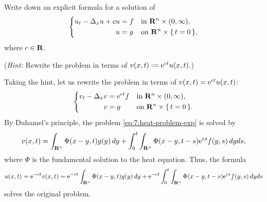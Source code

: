 \begin{problem}
  Write down an explicit formula for a solution of
  \[
    \left\{
      \begin{aligned}
        u_t-\Delta_x u+cu&=f&&\text{in \(\mathbf{R}^n\times(0,\infty)\),}\\
        u&=g&&\text{on \(\mathbf{R}^n\times\{\,t=0\,\}\),}
      \end{aligned}
    \right.
  \]
  where \(c\in\mathbf{R}\).

  \noindent (\emph{Hint:} Rewrite the problem in terms of
  \(v(x,t)\defeq\rme^{ct}u(x,t)\).)
\end{problem}
\begin{solution*}
  Taking the hint, let us rewrite the problem in terms of
  \(v(x,t)=\mathrm{e}^{ct}u(x,t)\):
  \begin{equation}
    \label{eq:7:heat-problem-exp}
    \left\{
      \begin{aligned}
        v_t-\Delta_xv&=\mathrm{e}^{ct}f&&\text{in
          \(\mathbf{R}^n\times(0,\infty),\)}\\
        v&=g&&\text{on \(\mathbf{R}^n\times\{\,t=0\,\}\).}
      \end{aligned}
    \right.
  \end{equation}
  By Duhamel's principle, the problem \eqref{eq:7:heat-problem-exp} is
  solved by
  \[
    v(x,t)=\int_{\mathbf{R}^n}\Phi(x-y,t)g(y)\mathop{}\!d y
    +\int_0^t\int_{\mathbf{R}^n}\Phi(x-y,t-s)\mathrm{e}^{cs}f(y,s)\mathop{}\!d yds,
  \]
  where \(\Phi\) is the fundamental solution to the heat equation. Thus,
  the formula
  \[
    u(x,t)=\mathrm{e}^{-ct}v(x,t)=\mathrm{e}^{-ct}\int_{\mathbf{R}^n}\Phi(x-y,t)g(y)\mathop{}\!d y
    +\mathrm{e}^{-ct}\int_0^t\int_{\mathbf{R}^n}\Phi(x-y,t-s)\mathrm{e}^{cs}f(y,s)\mathop{}\!d yds
  \]
  solves the original problem.
\end{solution*}

